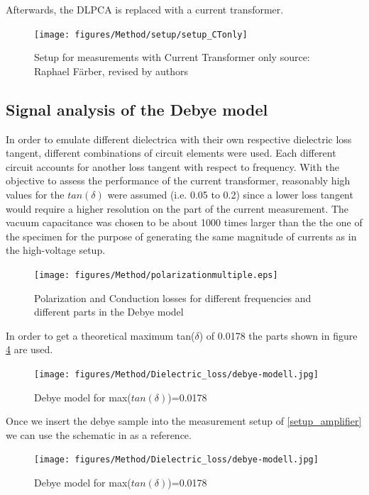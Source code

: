 Afterwards, the DLPCA is replaced with a current transformer. 
\begin{figure}[htbp]
	\centering
	\texttt{[image: figures/Method/setup/setup\_CTonly]}		
	\caption[Kurze Abbildungsbeschreibung]{Setup for measurements with Current Transformer only {source: Raphael F\"arber, revised by authors}} 
	\label{sec.setup }

\end{figure}


\subsection{Signal analysis of the Debye model}

In order to emulate different dielectrica with their own respective dielectric loss tangent, different combinations of circuit elements were used.
Each different circuit accounts for another loss tangent with respect to frequency. With the objective to assess the performance of the current transformer, reasonably high values for the $tan\left(\delta\right)$ were assumed (i.e. 0.05 to 0.2) since a lower loss tangent
would require a higher resolution on the part of the current measurement. The vacuum capacitance was chosen to be about 1000 times larger than
the the one of the specimen for the purpose of generating the same magnitude of currents as in the high-voltage setup.
\begin{figure}
	\texttt{[image: figures/Method/polarizationmultiple.eps]}	
	\caption{Polarization and Conduction losses for different frequencies and different parts in the Debye model}	
	\label{fig.debye-modell}
\end{figure}

In order to get a theoretical maximum tan($\delta$) of 0.0178 the parts shown in figure \ref{fig.debye-modell} are used. 
\begin{figure}
	\texttt{[image: figures/Method/Dielectric\_loss/debye-modell.jpg]}	
	\caption{Debye model for max($tan(\delta)$)=0.0178 }	
	\label{fig.debye-modell}
\end{figure}

Once we insert the debye sample into the measurement setup of \ref{setup_amplifier} we can use the schematic in as a reference.

\begin{figure}
	\texttt{[image: figures/Method/Dielectric\_loss/debye-modell.jpg]}	
	\caption{Debye model for max($tan(\delta)$)=0.0178 }	
	\label{fig.debye-modell}
\end{figure}

